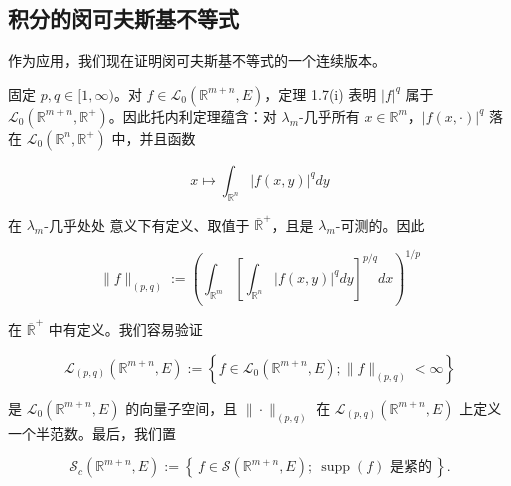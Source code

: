 \subsection*{积分的闵可夫斯基不等式}

作为应用，我们现在证明闵可夫斯基不等式的一个连续版本。

固定 $ p,q \in [1,\infty) $。对 $ f \in \mathcal{L}_0(\mathbb{R}^{m+n},E) $，定理 1.7(i) 表明 $ |f|^q $ 属于 $ \mathcal{L}_0(\mathbb{R}^{m+n},\mathbb{R}^+) $。因此托内利定理蕴含：对 $ \lambda_m $-几乎所有 $ x \in \mathbb{R}^m $，$ |f(x,\cdot)|^q $ 落在 $ \mathcal{L}_0(\mathbb{R}^n,\mathbb{R}^+) $ 中，并且函数

\[
x \mapsto \int_{\mathbb{R}^n}|f(x,y)|^q dy
\]

在 $ \lambda_m $-几乎处处 意义下有定义、取值于 $ \overline{\mathbb{R}}^+ $，且是 $ \lambda_m $-可测的。因此

\[
\|f\|_{(p,q)} := \left(\int_{\mathbb{R}^m}\left[\int_{\mathbb{R}^n}|f(x,y)|^q dy\right]^{p/q} dx\right)^{1/p}
\]

在 $ \overline{\mathbb{R}}^+ $ 中有定义。我们容易验证

\[
\mathcal{L}_{(p,q)}(\mathbb{R}^{m+n},E) := \left\{ f \in \mathcal{L}_0(\mathbb{R}^{m+n},E) ; \|f\|_{(p,q)} < \infty \right\}
\]

是 $ \mathcal{L}_{0}(\mathbb{R}^{m+n},E) $ 的向量子空间，且 $ \|\cdot\|_{(p,q)} $ 在 $ \mathcal{L}_{(p,q)}(\mathbb{R}^{m+n},E) $ 上定义一个半范数。最后，我们置

\[
\mathcal{S}_{c}(\mathbb{R}^{m+n},E) := \left\{\, f \in \mathcal{S}(\mathbb{R}^{m+n},E) ;\ \operatorname{supp}(f) \text{ 是紧的} \,\right\} .
\]

